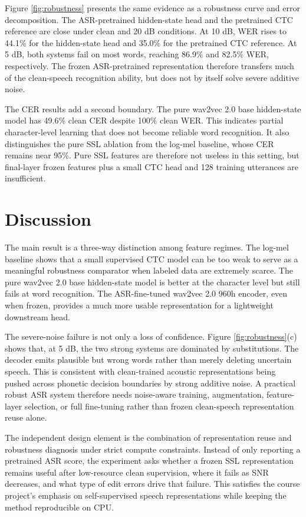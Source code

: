 \documentclass{article}
\begin{document}
Figure \ref{fig:robustness} presents the same evidence as a robustness curve and error decomposition. The ASR-pretrained hidden-state head and the pretrained CTC reference are close under clean and 20 dB conditions. At 10 dB, WER rises to 44.1\% for the hidden-state head and 35.0\% for the pretrained CTC reference. At 5 dB, both systems fail on most words, reaching 86.9\% and 82.5\% WER, respectively. The frozen ASR-pretrained representation therefore transfers much of the clean-speech recognition ability, but does not by itself solve severe additive noise.

The CER results add a second boundary. The pure wav2vec 2.0 base hidden-state model has 49.6\% clean CER despite 100\% clean WER. This indicates partial character-level learning that does not become reliable word recognition. It also distinguishes the pure SSL ablation from the log-mel baseline, whose CER remains near 95\%. Pure SSL features are therefore not useless in this setting, but final-layer frozen features plus a small CTC head and 128 training utterances are insufficient.

\section{Discussion}
\label{sec:discussion}

The main result is a three-way distinction among feature regimes. The log-mel baseline shows that a small supervised CTC model can be too weak to serve as a meaningful robustness comparator when labeled data are extremely scarce. The pure wav2vec 2.0 base hidden-state model is better at the character level but still fails at word recognition. The ASR-fine-tuned wav2vec 2.0 960h encoder, even when frozen, provides a much more usable representation for a lightweight downstream head.

The severe-noise failure is not only a loss of confidence. Figure \ref{fig:robustness}(c) shows that, at 5 dB, the two strong systems are dominated by substitutions. The decoder emits plausible but wrong words rather than merely deleting uncertain speech. This is consistent with clean-trained acoustic representations being pushed across phonetic decision boundaries by strong additive noise. A practical robust ASR system therefore needs noise-aware training, augmentation, feature-layer selection, or full fine-tuning rather than frozen clean-speech representation reuse alone.

The independent design element is the combination of representation reuse and robustness diagnosis under strict compute constraints. Instead of only reporting a pretrained ASR score, the experiment asks whether a frozen SSL representation remains useful after low-resource clean supervision, where it fails as SNR decreases, and what type of edit errors drive that failure. This satisfies the course project's emphasis on self-supervised speech representations while keeping the method reproducible on CPU.
\end{document}
